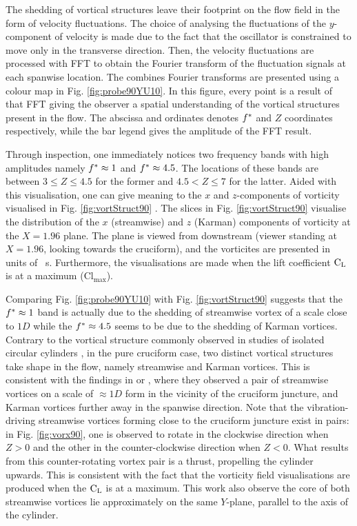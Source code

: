 \documentclass[oneside]{utmthesis}
\begin{document}
The shedding of vortical structures leave their footprint on the flow field in the form of velocity fluctuations. The choice of analysing the fluctuations of the $y$-component of velocity is made due to the fact that the oscillator is constrained to move only in the transverse direction. Then, the velocity fluctuations are processed with FFT to obtain the Fourier transform of the fluctuation signals at each spanwise location. The combines Fourier transforms are presented using a colour map in Fig. \ref{fig:probe90YU10}. In this figure, every point is a result of that FFT giving the observer a spatial understanding of the vortical structures present in the flow. The abscissa and ordinates denotes $f^{*}$ and $Z$ coordinates respectively, while the bar legend gives the amplitude of the FFT result.

Through inspection, one immediately notices two frequency bands with high amplitudes namely $f^{*} \approx 1$ and $f^{*} \approx 4.5$. The locations of these bands are between $3 \leq Z \leq 4.5$ for the former and $4.5 < Z \leq 7$ for the latter. Aided with this visualisation, one can give meaning to the $x$ and $z$-components of vorticity visualised in Fig. \ref{fig:vortStruct90} . The slices in Fig. \ref{fig:vortStruct90} visualise the distribution of the $x$ (streamwise) and $z$ (Karman) components of vorticity at the $X = 1.96$ plane. The plane is viewed from downstream (viewer standing at $X = 1.96$, looking towards the cruciform), and the vorticites are presented in units of \si{\per\second}. Furthermore, the visualisations are made when the lift coefficient $\text{C}_{\text{L}}$ is at a maximum ($\text{Cl}_{\text{max}}$).

Comparing Fig. \ref{fig:probe90YU10} with Fig. \ref{fig:vortStruct90} suggests that the $f^{*} \approx 1$ band is actually due to the shedding of streamwise vortex of a scale close to $1D$ while the $f^{*} \approx 4.5$ seems to be due to the shedding of Karman vortices. Contrary to the vortical structure commonly observed in studies of isolated circular cylinders \citep{Deng2007,Kinaci2016,Duranay2020}, in the pure cruciform case, two distinct vortical structures take shape in the flow, namely streamwise and Karman vortices. This is consistent with the findings in \citet{Koide2017} or \citet{Zhao2018a}, where they observed a pair of streamwise vortices on a scale of $\approx 1D$ form in the vicinity of the cruciform juncture, and Karman vortices further away in the spanwise direction. Note that the vibration-driving streamwise vortices forming close to the cruciform juncture exist in pairs: in Fig. \ref{fig:vorx90}, one is observed to rotate in the clockwise direction when $Z > 0$ and the other in the counter-clockwise direction when $Z < 0$. What results from this counter-rotating vortex pair is a thrust, propelling the cylinder upwards. This is consistent with the fact that the vorticity field visualisations are produced when the $\text{C}_{\text{L}}$ is at a maximum. This work also observe the core of both streamwise vortices lie approximately on the same $Y$-plane, parallel to the axis of the cylinder.
\end{document}
